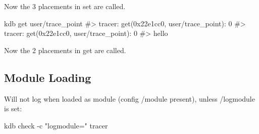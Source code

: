 Now the 3 placements in set are called.


\begin{DoxyCode}
kdb get user/trace\_point
#> tracer: get(0x22e1cc0, user/trace\_point): 0
#> tracer: get(0x22e1cc0, user/trace\_point): 0
#> hello
\end{DoxyCode}


Now the 2 placements in get are called.

\subsection*{Module Loading}

Will not log when loaded as module (config {\ttfamily /module} present), unless {\ttfamily /logmodule} is set\+:


\begin{DoxyCode}
kdb check -c "logmodule=" tracer
\end{DoxyCode}
 